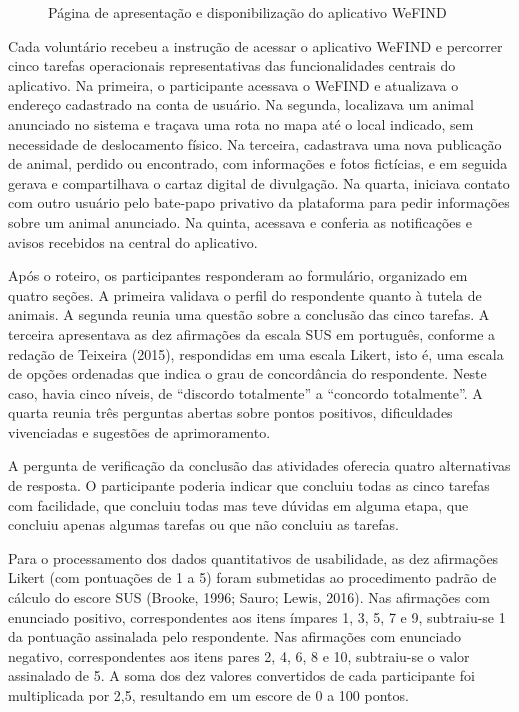 \begin{figure}[H]
    \centering
    \caption{Página de apresentação e disponibilização do aplicativo WeFIND}
    \label{fig:landing_page_wefind}
\end{figure}

Cada voluntário recebeu a instrução de acessar o aplicativo WeFIND e percorrer cinco tarefas operacionais representativas das funcionalidades centrais do aplicativo. Na primeira, o participante acessava o WeFIND e atualizava o endereço cadastrado na conta de usuário. Na segunda, localizava um animal anunciado no sistema e traçava uma rota no mapa até o local indicado, sem necessidade de deslocamento físico. Na terceira, cadastrava uma nova publicação de animal, perdido ou encontrado, com informações e fotos fictícias, e em seguida gerava e compartilhava o cartaz digital de divulgação. Na quarta, iniciava contato com outro usuário pelo bate-papo privativo da plataforma para pedir informações sobre um animal anunciado. Na quinta, acessava e conferia as notificações e avisos recebidos na central do aplicativo.

Após o roteiro, os participantes responderam ao formulário, organizado em quatro seções. A primeira validava o perfil do respondente quanto à tutela de animais. A segunda reunia uma questão sobre a conclusão das cinco tarefas. A terceira apresentava as dez afirmações da escala SUS em português, conforme a redação de Teixeira (2015), respondidas em uma escala Likert, isto é, uma escala de opções ordenadas que indica o grau de concordância do respondente. Neste caso, havia cinco níveis, de ``discordo totalmente'' a ``concordo totalmente''. A quarta reunia três perguntas abertas sobre pontos positivos, dificuldades vivenciadas e sugestões de aprimoramento.

A pergunta de verificação da conclusão das atividades oferecia quatro alternativas de resposta. O participante poderia indicar que concluiu todas as cinco tarefas com facilidade, que concluiu todas mas teve dúvidas em alguma etapa, que concluiu apenas algumas tarefas ou que não concluiu as tarefas.

Para o processamento dos dados quantitativos de usabilidade, as dez afirmações Likert (com pontuações de 1 a 5) foram submetidas ao procedimento padrão de cálculo do escore SUS (Brooke, 1996; Sauro; Lewis, 2016). Nas afirmações com enunciado positivo, correspondentes aos itens ímpares 1, 3, 5, 7 e 9, subtraiu-se 1 da pontuação assinalada pelo respondente. Nas afirmações com enunciado negativo, correspondentes aos itens pares 2, 4, 6, 8 e 10, subtraiu-se o valor assinalado de 5. A soma dos dez valores convertidos de cada participante foi multiplicada por 2,5, resultando em um escore de 0 a 100 pontos.

